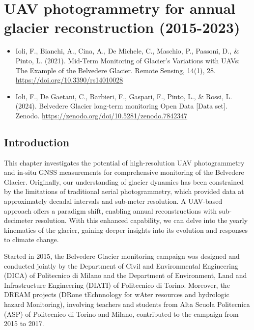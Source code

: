 \graphicspath{{figures/chapter3/}}
\onehalfspacing

\chapter{UAV photogrammetry for annual glacier reconstruction (2015-2023)}\label{ch:3}

\vfill


\begin{itemize}
    \item \noindent Ioli, F., Bianchi, A., Cina, A., De Michele, C., Maschio, P., Passoni, D., \&
Pinto, L. (2021). Mid-Term Monitoring of Glacier’s Variations with UAVs: The Example of the Belvedere Glacier. Remote Sensing, 14(1), 28. \url{https://doi.org/10.3390/rs14010028}
    \item Ioli, F., De Gaetani, C., Barbieri, F., Gaspari, F., Pinto, L., \& Rossi, L. (2024). Belvedere Glacier long-term monitoring Open Data [Data set]. Zenodo. \url{https://zenodo.org/doi/10.5281/zenodo.7842347}
\end{itemize}

\newpage

\section{Introduction}\label{sec:3:intro}

This chapter investigates the potential of high-resolution UAV photogrammetry and in-situ GNSS measurements for comprehensive monitoring of the Belvedere Glacier. 
Originally, our understanding of glacier dynamics has been constrained by the limitations of traditional aerial photogrammetry, which provided data at approximately decadal intervals and sub-meter resolution. 
A UAV-based approach offers a paradigm shift, enabling annual reconstructions with sub-decimeter resolution.
With this enhanced capability, we can delve into the yearly kinematics of the glacier, gaining deeper insights into its evolution and responses to climate change.

Started in 2015, the Belvedere Glacier monitoring campaign was designed and conducted jointly by the Department of Civil and Environmental Engineering (DICA) of Politecnico di Milano and the Department of Environment, Land and Infrastructure Engineering (DIATI) of Politecnico di Torino. 
Moreover, the DREAM projects (DRone tEchnnology for wAter resources and hydrologic hazard Monitoring), involving teachers and students from Alta Scuola Politecnica (ASP) of Politecnico di Torino and Milano, contributed to the campaign from 2015 to 2017.


